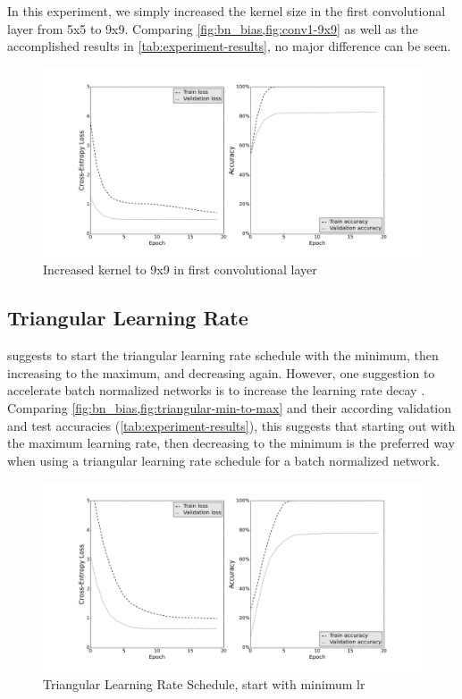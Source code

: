 \documentclass[a4paper, 11pt]{article}
\begin{document}
In this experiment, we simply increased the kernel size in the first convolutional layer from 5x5 to 9x9. Comparing \cref{fig:bn_bias,fig:conv1-9x9} as well as the accomplished results in \cref{tab:experiment-results}, no major difference can be seen.
\begin{figure}[H]
	\includegraphics[width=\linewidth]{conv1-9x9.png}
	\caption{Increased kernel to 9x9 in first convolutional layer }
	\label{fig:conv1-9x9}
\end{figure}

\clearpage

\subsection{Triangular Learning Rate} \label{sec:lr}
\citet{Smith2015} suggests to start the triangular learning rate schedule with the minimum, then increasing to the maximum, and decreasing again.
However, one suggestion to accelerate batch normalized networks is to increase the learning rate decay \cite{Ioffe2015}.
Comparing \cref{fig:bn_bias,fig:triangular-min-to-max} and their according validation and test accuracies (\cref{tab:experiment-results}), this suggests that starting out with the maximum learning rate, then decreasing to the minimum is the preferred way when using a triangular learning rate schedule for a batch normalized network.

\begin{figure}[H]
	\includegraphics[width=\linewidth]{triangular-min-to-max.png}
	\caption{Triangular Learning Rate Schedule, start with minimum lr }
	\label{fig:triangular-min-to-max}
\end{figure}
\end{document}
